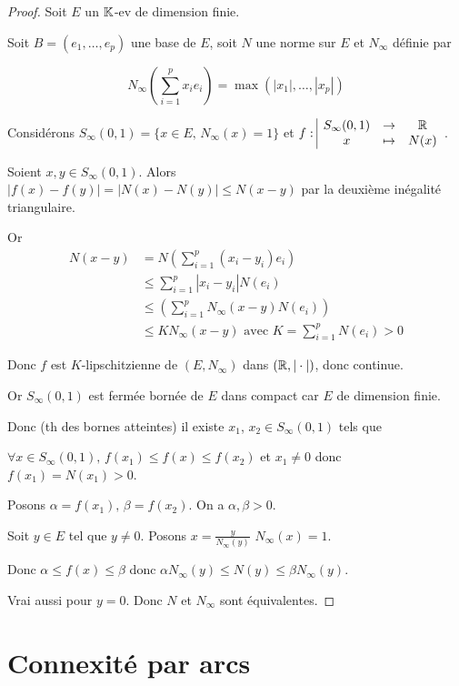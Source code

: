 \begin{proof}
    Soit $E$ un $\mathbb{K}$-ev de dimension finie. 

    Soit $B = (e_1, \ldots, e_p)$ une base de $E$, soit $N$ une norme sur $E$ et $N_\infty$ définie par 
    
    $$N_\infty \left( \sum_{i=1}^p x_i e_i \right) = \max(|x_1|, \ldots, |x_p|)$$

    Considérons $S_\infty (0, 1) = \{ x \in E, \, N_\infty(x) = 1 \}$ et 
    $f: \space \begin{array}{|ccc} \displaystyle S_\infty(0, 1) & \to & \displaystyle \mathbb{R} \\ \displaystyle x & \mapsto & \displaystyle N(x) \end{array}$.

    Soient $x, y \in S_\infty(0, 1)$. Alors $| f(x) - f(y)| = |N(x) - N(y)| \leqslant N(x - y)$ par la deuxième inégalité triangulaire. 

    Or \begin{align*}
        N(x - y) & = N\left( \sum_{i=1}^p (x_i - y_i) e_i \right) \\
        & \leqslant \sum_{i=1}^p |x_i - y_i| N(e_i) \\
        & \leqslant \left( \sum_{i=1}^p N_\infty(x - y) N(e_i) \right) \\
        & \leqslant K N_\infty(x - y) \text{ avec } K = \sum_{i=1}^p N(e_i) > 0
    \end{align*}

    Donc $f$ est $K$-lipschitzienne de $(E, N_\infty)$ dans $(\mathbb{R}, |\cdot |)$, donc continue.

    Or $S_\infty(0, 1)$ est fermée bornée de $E$ dans compact car $E$ de dimension finie. 

    Donc (th des bornes atteintes) il existe $x_1$, $x_2 \in S_\infty(0, 1)$ tels que

    $\forall x \in S_\infty(0, 1), \, f(x_1) \leqslant f(x) \leqslant f(x_2)$ et 
    $x_1 \neq 0$ donc $f(x_1) = N(x_1) > 0$. 

    Posons $ \alpha = f(x_1), \, \beta = f(x_2)$. On a $\alpha, \beta > 0$. 

    Soit $y \in E$ tel que $y \neq 0$. Posons $x = \frac y {N_\infty(y)}$ $N_\infty(x) = 1$.

    Donc $\alpha \leqslant f(x) \leqslant \beta$ donc $\alpha N_\infty(y) \leqslant N(y) \leqslant \beta N_\infty(y)$.

    Vrai aussi pour $y = 0$. Donc $N$ et $N_\infty$ sont équivalentes.
\end{proof}


\section{Connexité par arcs }

